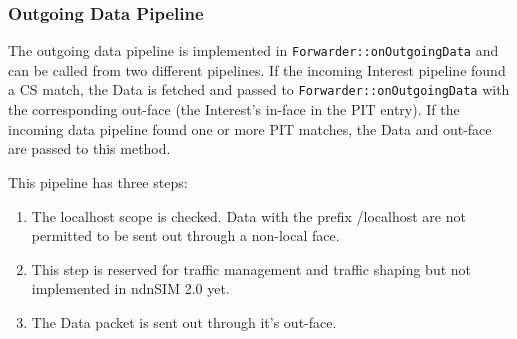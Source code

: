\subsubsection{Outgoing Data Pipeline}

The outgoing data pipeline is implemented in \texttt{Forwarder::onOutgoingData} and can be called from two different pipelines. If the incoming Interest pipeline found a CS match, the Data is fetched and passed to \texttt{Forwarder::onOutgoingData} with the corresponding out-face (the Interest's in-face in the PIT entry). If the incoming data pipeline found one or more PIT matches, the Data and out-face are passed to this method.

This pipeline has three steps:

\begin{enumerate}
\item The localhost scope is checked. Data with the prefix /localhost are not permitted to be sent out through a non-local face.
\item This step is reserved for traffic management and traffic shaping but not implemented in ndnSIM 2.0 yet.
\item The Data packet is sent out through it's out-face.
\end{enumerate}


